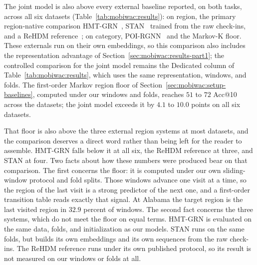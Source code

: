 The joint model is also above every external baseline reported, on both tasks,
across all six datasets (Table~\ref{tab:mobiwac:results}): on region, the primary
region-native comparison HMT-GRN~\cite{Lim2022}, STAN~\cite{luo2021stan}
trained from the raw check-ins, and a ReHDM reference~\cite{li2025rehdm}; on
category, POI-RGNN~\cite{capanema2023poirgnn} and the Markov-K floor. These externals run on their own embeddings, so this comparison
also includes the representation advantage of Section~\ref{sec:mobiwac:results-part1}; the
controlled comparison for the joint model remains the Dedicated column of
Table~\ref{tab:mobiwac:results}, which uses the same representation, windows, and
folds. The first-order Markov region floor of Section~\ref{sec:mobiwac:setup-baselines},
computed under our windows and folds, reaches $51$ to $72$ Acc@10 across the
datasets; the joint model exceeds it by $4.1$ to $10.0$ points on all six
datasets.

That floor is also above the three external region systems at most datasets, and the
comparison deserves a direct word rather than being left for the reader to assemble.
HMT-GRN falls below it at all six, the ReHDM reference at three, and STAN at four. Two
facts about how these numbers were produced bear on that comparison. The first concerns
the floor: it is computed under our own sliding-window protocol and fold splits. Those
windows advance one visit at a time, so the region of the last visit is a strong predictor
of the next one, and a first-order transition table reads exactly that signal. At Alabama the target region is the last visited region in $32.9$ percent of
windows.
The second
fact concerns the three systems, which do not meet the floor on equal terms. HMT-GRN is
evaluated on the same data, folds, and initialization as our models. STAN runs on the same
folds, but builds its own embeddings and its own sequences from the raw check-ins. The
ReHDM reference runs under its own published protocol, so its result is not measured on our
windows or folds at all.


